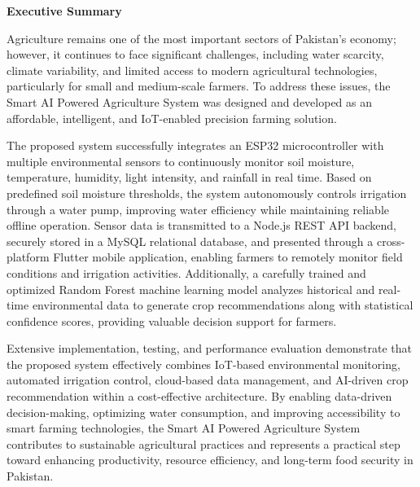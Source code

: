 
\clearpage


\vspace*{-0.15cm} 
{\centering
    {\fontsize{16pt}{20pt}\selectfont \textbf{Executive Summary} \par}
}
\vspace{0.5cm}

\noindent
Agriculture remains one of the most important sectors of Pakistan's economy; however, it continues to face significant challenges, including water scarcity, climate variability, and limited access to modern agricultural technologies, particularly for small and medium-scale farmers. To address these issues, the Smart AI Powered Agriculture System was designed and developed as an affordable, intelligent, and IoT-enabled precision farming solution.

The proposed system successfully integrates an ESP32 microcontroller with multiple environmental sensors to continuously monitor soil moisture, temperature, humidity, light intensity, and rainfall in real time. Based on predefined soil moisture thresholds, the system autonomously controls irrigation through a water pump, improving water efficiency while maintaining reliable offline operation. Sensor data is transmitted to a Node.js REST API backend, securely stored in a MySQL relational database, and presented through a cross-platform Flutter mobile application, enabling farmers to remotely monitor field conditions and irrigation activities. Additionally, a carefully trained and optimized Random Forest machine learning model analyzes historical and real-time environmental data to generate crop recommendations along with statistical confidence scores, providing valuable decision support for farmers.

Extensive implementation, testing, and performance evaluation demonstrate that the proposed system effectively combines IoT-based environmental monitoring, automated irrigation control, cloud-based data management, and AI-driven crop recommendation within a cost-effective architecture. By enabling data-driven decision-making, optimizing water consumption, and improving accessibility to smart farming technologies, the Smart AI Powered Agriculture System contributes to sustainable agricultural practices and represents a practical step toward enhancing productivity, resource efficiency, and long-term food security in Pakistan.